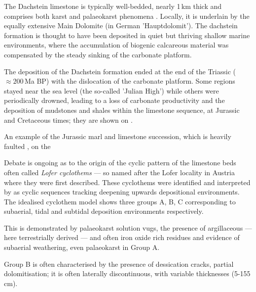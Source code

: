 The Dachstein limestone is typically well-bedded, nearly 1\,km thick and comprises both karst and palaeokarst phenomena \citep{ogorelec1996dachstein,haas2007characteristics}. Locally, it is underlain by the equally extensive Main Dolomite (in German 'Hauptdolomit'). The dachstein formation is thought to have been deposited in quiet but thriving shallow marine environments, where the accumulation of biogenic calcareous material was compensated by the steady sinking of the carbonate platform. 

The deposition of the Dachstein formation ended at the end of the Triassic ($\approx200$\,Ma BP) with the dislocation of the carbonate platform. Some regions stayed near the sea level (the so-called 'Julian High') while others were periodically drowned, leading to a loss of carbonate productivity and the deposition of mudstones and shales within the limestone sequence, at  Jurassic and Cretaceous \citep{vsmuc2010jurassic} times; they are shown on .





\begin{marginfigure}
\checkoddpage \ifoddpage \forcerectofloat \else \forceversofloat \fi
\centering
 \caption{An example of the Jurassic marl and limestone succession, which is heavily faulted , on the \protect{}}
 \label{fig:limestones and marls}
\end{marginfigure}

Debate is ongoing as to the origin of the cyclic pattern of the limestone beds often called \emph{Lofer cyclothems} --- so named after the Lofer locality in Austria where they were first described. 
These cyclothems were identified and interpreted by \citet{fisher1964lofer} as cyclic sequences tracking deepening upwards depositional environments.
The idealised cyclothem model shows three groups A, B, C corresponding to  subaerial, tidal and subtidal deposition environments respectively.  

This is demonstrated by palaeokarst solution vugs, the presence of argillaceous --- here terrestrially derived --- and often iron oxide rich residues and evidence of subaerial weathering, even palaeokarst in Group A.

Group B is often characterised by the presence of dessication cracks, partial dolomitisation; it is often laterally discontinuous, with variable thicknesses (5-155\,cm).

